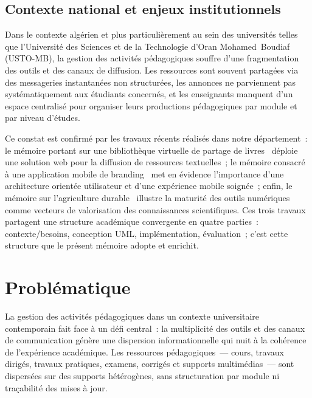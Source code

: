 \subsection{Contexte national et enjeux institutionnels}

Dans le contexte alg\'erien et plus particuli\`erement au sein des universit\'es telles que l'Universit\'e des Sciences et de la Technologie d'Oran Mohamed~Boudiaf (USTO-MB), la gestion des activit\'es p\'edagogiques souffre d'une fragmentation des outils et des canaux de diffusion. Les ressources sont souvent partag\'ees via des messageries instantan\'ees non structur\'ees, les annonces ne parviennent pas syst\'ematiquement aux \'etudiants concern\'es, et les enseignants manquent d'un espace centralis\'e pour organiser leurs productions p\'edagogiques par module et par niveau d'\'etudes.

Ce constat est confirm\'e par les travaux r\'ecents r\'ealis\'es dans notre d\'epartement~: le m\'emoire portant sur une biblioth\`eque virtuelle de partage de livres~\cite{memoire_bibliotheque_2025} d\'eploie une solution web pour la diffusion de ressources textuelles~; le m\'emoire consacr\'e \`a une application mobile de branding~\cite{memoire_branding_2025} met en \'evidence l'importance d'une architecture orient\'ee utilisateur et d'une exp\'erience mobile soign\'ee~; enfin, le m\'emoire sur l'agriculture durable~\cite{memoire_agriculture_2024} illustre la maturit\'e des outils num\'eriques comme vecteurs de valorisation des connaissances scientifiques. Ces trois travaux partagent une structure acad\'emique convergente en quatre parties~: contexte/besoins, conception UML, impl\'ementation, \'evaluation~; c'est cette structure que le pr\'esent m\'emoire adopte et enrichit.

\section{Probl\'ematique}
\label{sec:problematique}

La gestion des activit\'es p\'edagogiques dans un contexte universitaire contemporain fait face \`a un d\'efi central~: la multiplicit\'e des outils et des canaux de communication g\'en\`ere une dispersion informationnelle qui nuit \`a la coh\'erence de l'exp\'erience acad\'emique. Les ressources p\'edagogiques~--- cours, travaux dirig\'es, travaux pratiques, examens, corrig\'es et supports multim\'edias~--- sont dispers\'ees sur des supports h\'et\'erog\`enes, sans structuration par module ni tra\c{c}abilit\'e des mises \`a jour.

